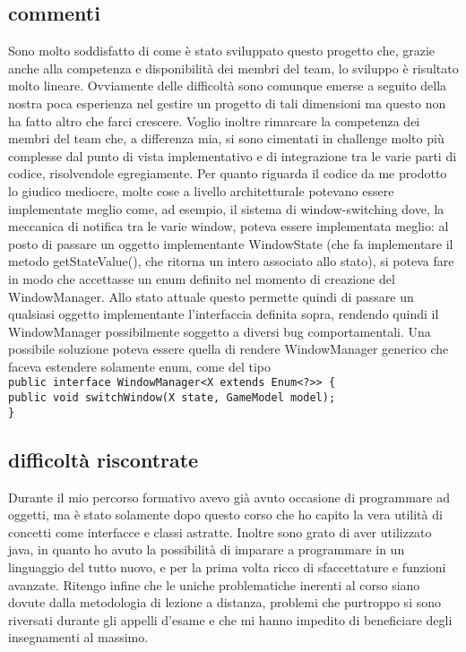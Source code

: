 \documentclass[a4paper,12pt]{report}
\begin{document}
\subsection{commenti}
Sono molto soddisfatto di come è stato sviluppato questo progetto che, grazie anche alla competenza e disponibilità dei membri del team, 
lo sviluppo è risultato molto lineare. Ovviamente delle difficoltà sono comunque emerse a seguito della nostra poca esperienza nel gestire 
un progetto di tali dimensioni ma questo non ha fatto altro che farci crescere.
Voglio inoltre rimarcare la competenza dei membri del team che, a differenza mia, si sono cimentati in challenge molto più complesse dal punto
di vista implementativo e di integrazione tra le varie parti di codice, risolvendole egregiamente.
Per quanto riguarda il codice da me prodotto lo giudico mediocre, molte cose a livello architetturale potevano essere implementate meglio
come, ad esempio, il sistema di window-switching dove, la meccanica di notifica tra le varie window, poteva essere implementata meglio: 
al posto di passare un oggetto implementante WindowState (che fa implementare il metodo getStateValue(), che ritorna un intero associato
allo stato), si poteva fare in modo che accettasse un enum definito nel momento di creazione del WindowManager.
Allo stato attuale questo permette quindi di passare un qualsiasi oggetto implementante l'interfaccia definita sopra, rendendo quindi
il WindowManager possibilmente soggetto a diversi bug comportamentali.
Una possibile soluzione poteva essere quella di rendere WindowManager generico che faceva estendere solamente enum, come del tipo \\
\texttt{public interface WindowManager<X extends Enum<?>> \{ \\
	public void switchWindow(X state, GameModel model);\\
	\}} \\
\subsection{difficoltà riscontrate}
Durante il mio percorso formativo avevo già avuto occasione di programmare ad oggetti, ma è stato solamente dopo questo corso che ho capito la vera utilità di concetti come interfacce e classi astratte. Inoltre sono grato di aver utilizzato java, in quanto ho avuto la possibilità di imparare a programmare in un linguaggio del tutto nuovo, e per la prima volta ricco di sfaccettature e funzioni avanzate.
Ritengo infine che le uniche problematiche inerenti al corso siano dovute dalla metodologia di lezione a distanza, problemi che purtroppo si sono riversati durante gli appelli d'esame e che mi hanno impedito di beneficiare degli insegnamenti al massimo.
\newpage
\end{document}
